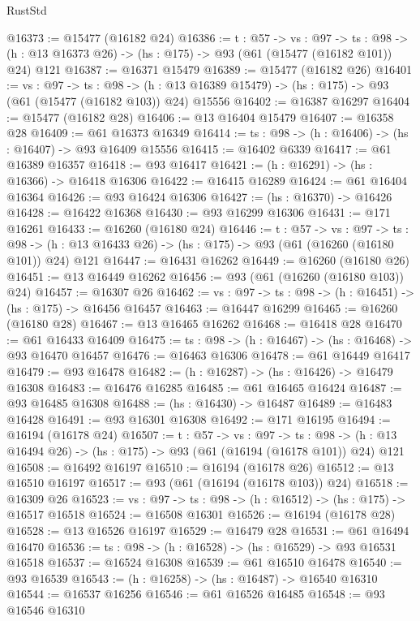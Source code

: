 \begin{lexlean}{RustStd}
\begin{coremodule}
@16373 := @15477 (@16182 @24)
@16386 := {t : @57} ->
  {vs : @97} ->
  {ts : @98} -> (h : @13 @16373 @26) -> (hs : @175) -> @93 (@61 (@15477 (@16182 @101)) @24) @121
@16387 := @16371 @15479
@16389 := @15477 (@16182 @26)
@16401 := {vs : @97} ->
  {ts : @98} ->
  (h : @13 @16389 @15479) -> (hs : @175) -> @93 (@61 (@15477 (@16182 @103)) @24) @15556
@16402 := @16387 @16297
@16404 := @15477 (@16182 @28)
@16406 := @13 @16404 @15479
@16407 := @16358 @28
@16409 := @61 @16373 @16349
@16414 := {ts : @98} -> (h : @16406) -> (hs : @16407) -> @93 @16409 @15556
@16415 := @16402 @6339
@16417 := @61 @16389 @16357
@16418 := @93 @16417
@16421 := (h : @16291) -> (hs : @16366) -> @16418 @16306
@16422 := @16415 @16289
@16424 := @61 @16404 @16364
@16426 := @93 @16424 @16306
@16427 := (hs : @16370) -> @16426
@16428 := @16422 @16368
@16430 := @93 @16299 @16306
@16431 := @171 @16261
@16433 := @16260 (@16180 @24)
@16446 := {t : @57} ->
  {vs : @97} ->
  {ts : @98} -> (h : @13 @16433 @26) -> (hs : @175) -> @93 (@61 (@16260 (@16180 @101)) @24) @121
@16447 := @16431 @16262
@16449 := @16260 (@16180 @26)
@16451 := @13 @16449 @16262
@16456 := @93 (@61 (@16260 (@16180 @103)) @24)
@16457 := @16307 @26
@16462 := {vs : @97} -> {ts : @98} -> (h : @16451) -> (hs : @175) -> @16456 @16457
@16463 := @16447 @16299
@16465 := @16260 (@16180 @28)
@16467 := @13 @16465 @16262
@16468 := @16418 @28
@16470 := @61 @16433 @16409
@16475 := {ts : @98} -> (h : @16467) -> (hs : @16468) -> @93 @16470 @16457
@16476 := @16463 @16306
@16478 := @61 @16449 @16417
@16479 := @93 @16478
@16482 := (h : @16287) -> (hs : @16426) -> @16479 @16308
@16483 := @16476 @16285
@16485 := @61 @16465 @16424
@16487 := @93 @16485 @16308
@16488 := (hs : @16430) -> @16487
@16489 := @16483 @16428
@16491 := @93 @16301 @16308
@16492 := @171 @16195
@16494 := @16194 (@16178 @24)
@16507 := {t : @57} ->
  {vs : @97} ->
  {ts : @98} -> (h : @13 @16494 @26) -> (hs : @175) -> @93 (@61 (@16194 (@16178 @101)) @24) @121
@16508 := @16492 @16197
@16510 := @16194 (@16178 @26)
@16512 := @13 @16510 @16197
@16517 := @93 (@61 (@16194 (@16178 @103)) @24)
@16518 := @16309 @26
@16523 := {vs : @97} -> {ts : @98} -> (h : @16512) -> (hs : @175) -> @16517 @16518
@16524 := @16508 @16301
@16526 := @16194 (@16178 @28)
@16528 := @13 @16526 @16197
@16529 := @16479 @28
@16531 := @61 @16494 @16470
@16536 := {ts : @98} -> (h : @16528) -> (hs : @16529) -> @93 @16531 @16518
@16537 := @16524 @16308
@16539 := @61 @16510 @16478
@16540 := @93 @16539
@16543 := (h : @16258) -> (hs : @16487) -> @16540 @16310
@16544 := @16537 @16256
@16546 := @61 @16526 @16485
@16548 := @93 @16546 @16310

\end{coremodule}
\end{lexlean}
